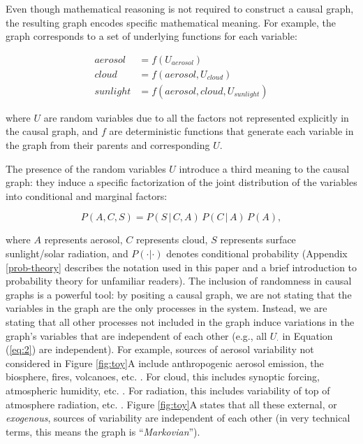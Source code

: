\documentclass[12pt]{article}
\begin{document}
Even though mathematical reasoning is not required to construct a
causal graph, the resulting graph encodes specific mathematical
meaning. For example, the graph corresponds to a set of underlying
functions for each variable:

\begin{align}
  \label{eq:2}
  aerosol &= f(U_{aerosol}) \\
  cloud &= f(aerosol, U_{cloud})\\
  sunlight &= f(aerosol, cloud, U_{sunlight})
\end{align}

where $U$ are random variables due to all the factors not represented
explicitly in the causal graph, and $f$ are deterministic functions
that generate each variable in the graph from their parents and
corresponding $U$.

The presence of the random variables $U$ introduce
a third meaning to the causal graph: they induce a specific
factorization of the joint distribution of the variables into
conditional and marginal factors:

\begin{equation}
  P(A, C, S) = P(S \, | \,C, A) \, P(C \, | \, A) \, P(A),
\end{equation}

where $A$ represents aerosol, $C$ represents cloud, $S$ represents
surface sunlight/solar radiation, and $P(\cdot | \cdot)$ denotes
conditional probability (Appendix \ref{prob-theory} describes the
notation used in this paper and a brief introduction to probability
theory for unfamiliar readers). The inclusion of randomness in causal
graphs is a powerful tool: by positing a causal graph, we are not
stating that the variables in the graph are the only processes in the
system. Instead, we are stating that all other processes not included
in the graph induce variations in the graph's variables that are
independent of each other (e.g., all $U_{\cdot}$ in Equation
(\ref{eq:2}) are independent). For example, sources of aerosol
variability not considered in Figure \ref{fig:toy}A include
anthropogenic aerosol emission, the biosphere, fires, volcanoes,
etc. \citep[e.g.,][]{Boucher2015}. For cloud, this includes synoptic
forcing, atmospheric humidity,
etc. \citep[e.g.,][]{wallace2006atmospheric}. For radiation, this
includes variability of top of atmosphere radiation,
etc. \citep[e.g.,][]{hartmann2015global}. Figure \ref{fig:toy}A states
that all these external, or \textit{exogenous}, sources of variability
are independent of each other (in very technical terms, this means the
graph is ``\textit{Markovian}'').
\end{document}
